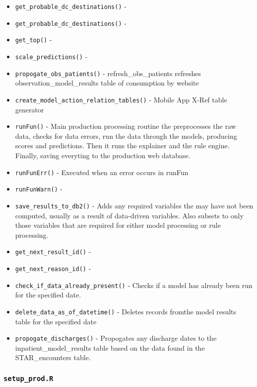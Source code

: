 \documentclass[
]{book}
\begin{document}
\begin{itemize}
\item
  \texttt{get\_probable\_dc\_destinations()} -
\item
  \texttt{get\_probable\_dc\_destinations()} -
\item
  \texttt{get\_top()} -
\item
  \texttt{scale\_predictions()} -
\item
  \texttt{propogate\_obs\_patients()} - refresh\_obs\_patients refreshes observation\_model\_results table of consumption by website
\item
  \texttt{create\_model\_action\_relation\_tables()} - Mobile App X-Ref table generator
\item
  \texttt{runFun()} - Main production processing routine the preprocesses the raw data, checks for data errors, run the data through the models, producing scores and predictions. Then it runs the explainer and the rule engine. Finally, saving everyting to the production web database.
\item
  \texttt{runFunErr()} - Executed when an error occurs in runFun
\item
  \texttt{runFunWarn()} -
\item
  \texttt{save\_results\_to\_db2()} - Adds any required variables the may have not been computed, usually as a result of data-driven variables. Also subsets to only those variables that are required for either model processing or rule processing.
\item
  \texttt{get\_next\_result\_id()} -
\item
  \texttt{get\_next\_reason\_id()} -
\item
  \texttt{check\_if\_data\_already\_present()} - Checks if a model has already been run for the specified date.
\item
  \texttt{delete\_data\_as\_of\_datetime()} - Deletes records fromthe model results table for the specified date
\item
  \texttt{propogate\_discharges()} - Propogates any discharge dates to the inpatient\_model\_results table based on the data found in the STAR\_encounters table.
\end{itemize}

\hypertarget{setup_prod.r-2}{%
\subsubsection{\texorpdfstring{\texttt{setup\_prod.R}}{setup\_prod.R}}\label{setup_prod.r-2}}
\end{document}
